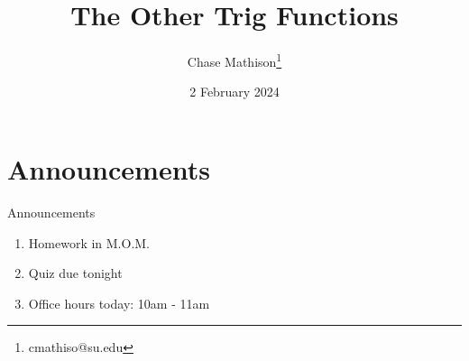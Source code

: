 \documentclass[presentation]{beamer}
\institute[SU]{Shenandoah University}
\author{Chase Mathison\thanks{cmathiso@su.edu}}
\date{2 February 2024}
\title{The Other Trig Functions}
\begin{document}
\maketitle

\section{Announcements}
\label{sec:orgbf5a172}
\begin{frame}[label={sec:orgd735532}]{Announcements}
\begin{enumerate}
\item Homework in M.O.M.
\item Quiz due tonight
\item Office hours today: 10am - 11am
\end{enumerate}
\end{frame}
\end{document}
